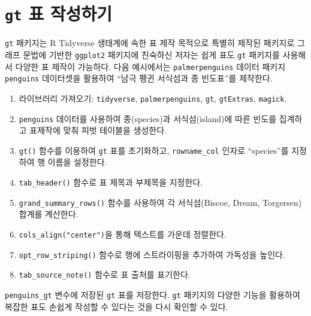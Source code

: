 \documentclass[
  letterpaper,
]{book}
\providecommand{\tightlist}{%
  \setlength{\itemsep}{0pt}\setlength{\parskip}{0pt}}\usepackage{longtable,booktabs,array}
\begin{document}
\hypertarget{gt-uxd45c-uxc791uxc131uxd558uxae30}{%
\section{\texorpdfstring{\texttt{gt} 표
작성하기}{gt 표 작성하기}}\label{gt-uxd45c-uxc791uxc131uxd558uxae30}}

\texttt{gt} 패키지는 R Tidyverse 생태계에 속한 표 제작 목적으로 특별히
제작된 패키지로 그래프 문법에 기반한 \texttt{ggplot2} 패키지에 친숙하신
저자는 쉽게 표도 \texttt{gt} 패키지를 사용해서 다양한 표 제작이
가능하다. 다음 예시에서는 \texttt{palmerpenguins} 데이터 패키지
\texttt{penguins} 데이터셋을 활용하여 ``남극 펭귄 서식섬과 종 빈도표''를
제작한다.

\begin{enumerate}
\def\labelenumi{\arabic{enumi}.}
\tightlist
\item
  라이브러리 가져오기: \texttt{tidyverse}, \texttt{palmerpenguins},
  \texttt{gt}, \texttt{gtExtras}, \texttt{magick}.
\item
  \texttt{penguins} 데이터를 사용하여 종(species)과 서식섬(island)에
  따른 빈도를 집계하고 표제작에 맞춰 피벗 테이블을 생성한다.
\item
  \texttt{gt()} 함수를 이용하여 \texttt{gt} 표를 초기화하고,
  \texttt{rowname\_col} 인자로 ``species''를 지정하여 행 이름을
  설정한다.
\item
  \texttt{tab\_header()} 함수로 표 제목과 부제목을 지정한다.
\item
  \texttt{grand\_summary\_rows()} 함수를 사용하여 각 서식섬(Biscoe,
  Dream, Torgersen) 합계를 계산한다.
\item
  \texttt{cols\_align("center")}을 통해 텍스트를 가운데 정렬한다.
\item
  \texttt{opt\_row\_striping()} 함수로 행에 스트라이핑을 추가하여
  가독성을 높인다.
\item
  \texttt{tab\_source\_note()} 함수로 표 출처를 표기한다.
\end{enumerate}

\texttt{penguins\_gt} 변수에 저장된 \texttt{gt} 표를 저장한다.
\texttt{gt} 패키지의 다양한 기능을 활용하여 복잡한 표도 손쉽게 작성할 수
있다는 것을 다시 확인할 수 있다.
\end{document}
